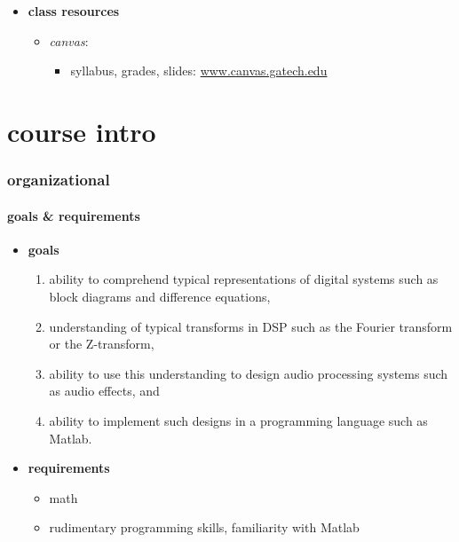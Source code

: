 \begin{frame}
\begin{itemize}
                \smallskip
                \item<3-> \textbf{class resources}
                    \begin{itemize}
                        \item	\textit{canvas}:
                            \begin{itemize}
                                \item   syllabus, grades, slides: \url{www.canvas.gatech.edu}
                            \end{itemize}
                    \end{itemize}
            \end{itemize}
        \end{frame}

    \section{course intro}
        \begin{frame}\frametitle{organizational}\framesubtitle{goals \& requirements}
            \begin{itemize}
                \item	\textbf{goals}
                        \begin{enumerate}
                            \item   ability to comprehend typical representations of digital systems such as block diagrams and difference equations,
                            \item   understanding of typical transforms in DSP such as the Fourier transform or the Z-transform,
                            \item    ability to use this understanding to design audio processing systems such as audio effects, and
                            \item	ability to implement such designs in a programming language such as Matlab.
                        \end{enumerate}

                \smallskip
                \item<2-> \textbf{requirements}	
                        \begin{itemize}
                            \item	math
                            \item	rudimentary programming skills, familiarity with Matlab
                        \end{itemize}
            \end{itemize}
        \end{frame}
